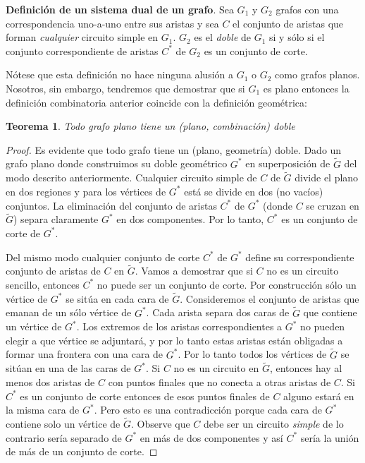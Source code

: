 \documentclass[10pt,a5paper]{book}
\newtheorem{teorema}{Teorema}[chapter]
\begin{document}
\textbf{Definición de un sistema dual de un grafo}. Sea $G_1$ y $G_2$ grafos con una correspondencia uno-a-uno entre sus aristas y sea $C$ el conjunto de aristas que forman \emph{cualquier} circuito simple en $G_1$. $G_2$ es el \emph{doble} de $G_1$ si y sólo si el conjunto correspondiente de aristas $C^*$ de $G_2$ es un conjunto de corte.

Nótese que esta definición no hace ninguna alusión a $G_1$ o $G_2$ como grafos planos. Nosotros, sin embargo, tendremos que demostrar que si $G_1$ es plano entonces la definición combinatoria anterior coincide con la definición geométrica:

\begin{teorema}
Todo grafo plano tiene un (plano, combinación) doble
\end{teorema}
\begin{proof}
Es evidente que todo grafo tiene un (plano, geometría) doble. Dado un grafo plano donde construimos su doble geométrico $G^*$ en superposición de $\widetilde{G}$ del modo descrito anteriormente. Cualquier circuito simple de $C$ de $\widetilde{G}$ divide el plano en dos regiones y para los vértices de $G^*$ está se divide en dos (no vacíos) conjuntos. La eliminación del conjunto de aristas $C^*$ de $G^*$ (donde $C$ se cruzan en $\widetilde{G}$) separa claramente $G^*$ en dos componentes. Por lo tanto, $C^*$ es un conjunto de corte de $G^*$.

Del mismo modo cualquier conjunto de corte $C^*$ de $G^*$ define su correspondiente conjunto de aristas de $C$ en $\widetilde{G}$. Vamos a demostrar que si $C$ no es un circuito sencillo, entonces $C^*$ no puede ser un conjunto de corte. Por construcción sólo un vértice de $G^*$ se sitúa en cada cara de $\widetilde{G}$. Consideremos el conjunto de aristas que emanan de un sólo vértice de $G^*$. Cada arista separa dos caras de $\widetilde{G}$ que contiene un vértice de $G^*$. Los extremos de los aristas correspondientes a $G^*$ no pueden elegir a que vértice se adjuntará, y por lo tanto estas aristas están obligadas a formar una frontera con una cara de $G^*$. Por lo tanto todos los vértices de $\widetilde{G}$ se sitúan en una de las caras de $G^*$. Si $C$ no es un circuito en $\widetilde{G}$, entonces hay al menos dos aristas de $C$ con puntos finales que no conecta a otras aristas de $C$. Si $C^*$ es un conjunto de corte entonces de esos puntos finales de $C$ alguno estará en la misma cara de $G^*$. Pero esto es una contradicción porque cada cara de $G^*$ contiene solo un vértice de $\widetilde{G}$. Observe que $C$ debe ser un circuito \emph{simple} de lo contrario sería separado de $G^*$ en más de dos componentes y así $C^*$ sería la unión de más de un conjunto de corte.
\end{proof}
\end{document}
